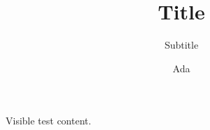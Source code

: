 \documentclass[paper=A4]{ropas-poster}
\title{Title}\subtitle{Subtitle}\author{Ada}\institute{Lab}
\begin{document}
Visible test content.
\end{document}
